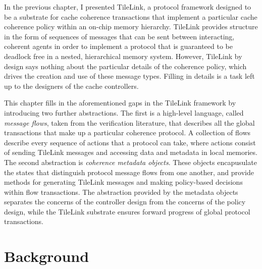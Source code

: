 In the previous chapter, I presented TileLink,
a protocol framework designed to be a substrate for cache coherence transactions that implement a particular cache coherence policy within an on-chip memory hierarchy. 
TileLink provides structure in the form of sequences of messages that can be sent between interacting, coherent agents in order
to implement a protocol that is guaranteed to be deadlock free in a nested, hierarchical memory system.
However, TileLink by design says nothing about the particular details of the coherence policy,
which drives the creation and use of these message types.
Filling in details is a task left up to the designers of the cache controllers.

This chapter fills in the aforementioned gaps in the TileLink framework by introducing two further abstractions.
The first is a high-level language,
called \emph{message flows},
taken from the verification literature, 
that describes all the global transactions that make up a particular coherence protocol.
A collection of flows describe every sequence of actions that a protocol can take,
where actions consist of sending TileLink messages and accessing  data and metadata in local memories.
The second abstraction is \emph{coherence metadata objects}.
These objects encapusulate the states that distinguish protocol message flows from one another,
and provide methods for generating TileLink messages and making policy-based decisions within flow transactions.
The abstraction provided by the metadata objects separates the concerns of the controller design from the concerns of the policy design, 
while the TileLink substrate ensures forward progress of global protocol transactions.

\section{Background} 

